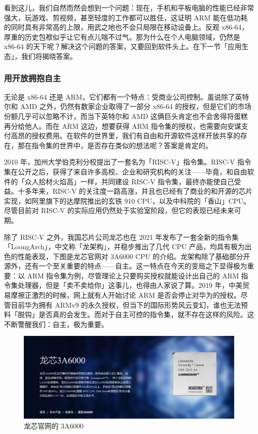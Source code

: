 看到这儿，我们自然而然会想到一个问题：现在，手机和平板电脑的性能已经非常强大，玩游戏、剪视频，甚至轻度的工作都可以胜任，这证明 ARM 能在低功耗的同时具有非常高的上限，用武之地也不会只局限在移动设备上。反观 x86-64，厚重的历史包袱似乎让它有点儿喘不过气。那为什么在个人电脑领域，仍然是 x86-64 的天下呢？解决这个问题的答案，又要回到软件头上。在下一节「应用生态」，我们将揭晓答案。

\subsubsection{用开放拥抱自主}

无论是 x86-64 还是 ARM，它们都有一个特点：受商业公司控制。虽说除了英特尔和 AMD 之外，仍然有数家企业取得了一部分 x86-64 的授权，但是它们的市场份额几乎可以忽略不计，而当下英特尔和 AMD 这俩巨头肯定也不会舍得将蛋糕再分给他人。而在 ARM 这边，想要获得 ARM 指令集的授权，也需要向安谋支付高昂的授权费用。在软件的世界里，我们有自由和开源软件这样开放共享的存在，那在指令集的世界中，是否存在类似的想法呢？答案是肯定的。

2010 年，加州大学伯克利分校提出了一套名为「RISC-V」指令集。RISC-V 指令集在公开之后，获得了来自许多高校、企业和研究机构的关注——毕竟，和自由软件的「众人拾材火焰高」一样，共同建设 RISC-V 指令集，最终亦能使自己受益。十多年来，RISC-V 的关注度一路高涨，并且也已经有了商业的和开源的芯片实现，如阿里旗下的达摩院推出的玄铁 910 CPU，以及中科院的「香山」CPU。尽管目前对 RISC-V 的实际应用仍然处于实验室阶段，但它的表现已经未来可期。

除了 RISC-V 之外，我国芯片公司龙芯也在 2021 年发布了一套全新的指令集「LoongArch」，中文称「龙架构」，并稳步推出了几代 CPU 产品，均具有极为出色的性能表现，下图是龙芯官网对 3A6000 CPU 的介绍。龙架构除了基础部分开源外，还有一个至关重要的特点——自主。这一特点在今天的变局之下显得极为重要：以 ARM 指令集为例，尽管理论上只要购买授权就能设计出自己的 ARM 指令集处理器，但是「卖不卖给你」这事儿，也得由人家说了算。2019 年，中美贸易摩擦正激烈的时候，网上就有人开始讨论 ARM 是否会停止对华为的授权。尽管目前华为拥有 ARMv9 的永久授权，但当下的国际形势风云变幻，谁也无法预料「脱钩」是否真的会发生。而对于自主可控的指令集，就不存在这样的风险。这不断警醒我们：自主，极为重要。

\begin{figure}[htb!]
  \centering
  \includegraphics[width=.8\textwidth]{assets/surpass/LS3A6K_webpage.png}
  \caption{龙芯官网的 3A6000}
  \label{fig:LS3A6K_webpage}
\end{figure}

